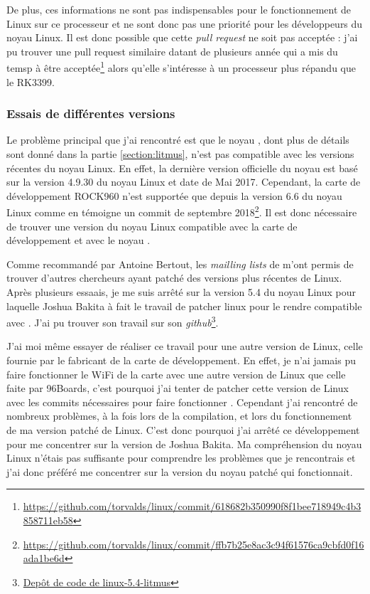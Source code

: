 De plus, ces informations ne sont pas indispensables pour le fonctionnement de Linux sur ce processeur et ne sont donc pas une priorité pour les développeurs du noyau Linux. Il est donc possible que cette \textit{pull request} ne soit pas acceptée : j'ai pu trouver une pull request similaire datant de plusieurs année qui a mis du temsp à être acceptée\footnote{\href{https://github.com/torvalds/linux/commit/618682b350990f8f1bee718949c4b3858711eb58}{https://github.com/torvalds/linux/commit/618682b350990f8f1bee718949c4b3858711eb58}} alors qu'elle s'intéresse à un processeur plus répandu que le RK3399.


\subsubsection{Essais de différentes versions}

Le problème principal que j'ai rencontré est que le noyau \litmus, dont plus de détails sont donné dans la partie \ref{section:litmus}, n'est pas compatible avec les versions récentes du noyau Linux. En effet, la dernière version officielle du noyau \litmus est basé sur la version 4.9.30 du noyau Linux et date de Mai 2017. Cependant, la carte de développement ROCK960 n'est supportée que depuis la version 6.6 du noyau Linux comme en témoigne un commit de septembre 2018\footnote{\href{https://github.com/torvalds/linux/commit/ffb7b25e8ac3c94f61576ca9cbfd0f16ada1be6d}{https://github.com/torvalds/linux/commit/ffb7b25e8ac3c94f61576ca9cbfd0f16ada1be6d}}. Il est donc nécessaire de trouver une version du noyau Linux compatible avec la carte de développement et avec le noyau \litmus.

Comme recommandé par Antoine Bertout, les \textit{mailling lists} de \litmus m'ont permis de trouver d'autres chercheurs ayant patché des versions plus récentes de Linux. Après plusieurs essaais, je me suis arrêté sur la version 5.4 du noyau Linux pour laquelle Joshua Bakita à fait le travail de patcher linux pour le rendre compatible avec \litmus. J'ai pu trouver son travail sur son \textit{github}\footnote{\href{https://github.com/JoshuaJB/litmus-rt/tree/linux-5.4-litmus}{Depôt de code de linux-5.4-litmus}}. 

J'ai moi même essayer de réaliser ce travail pour une autre version de Linux, celle fournie par le fabricant de la carte de développement. En effet, je n'ai jamais pu faire fonctionner le WiFi de la carte avec une autre version de Linux que celle faite par 96Boards, c'est pourquoi j'ai tenter de patcher cette version de Linux avec les commits nécessaires pour faire fonctionner \litmus. Cependant j'ai rencontré de nombreux problèmes, à la fois lors de la compilation, et lors du fonctionnement de ma version patché de Linux. C'est donc pourquoi j'ai arrêté ce développement pour me concentrer sur la version de Joshua Bakita. Ma compréhension du noyau Linux n'étais pas suffisante pour comprendre les problèmes que je rencontrais et j'ai donc préféré me concentrer sur la version du noyau patché qui fonctionnait.

